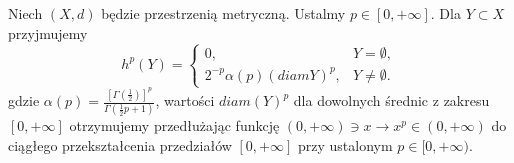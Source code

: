 \begin{defi}
	Niech $(X, d)$ będzie przestrzenią metryczną. Ustalmy $p \in [0, +\infty]$. Dla $Y \subset X$ przyjmujemy 
	$$
		h^p(Y) = 
		\begin{cases}
			0, & Y = \emptyset, \\
			2^{-p}\alpha(p)(diam Y)^p, & Y \neq \emptyset.
		\end{cases}
	$$ gdzie $\alpha(p) = \frac{[\Gamma(\frac{1}{2})]^p}{\Gamma(\frac{1}{2}p + 1)}$, wartości $diam(Y)^p$ dla dowolnych średnic z zakresu $[0, +\infty]$ otrzymujemy przedłużając funkcję $(0, +\infty) \ni x \rightarrow x^p \in (0, +\infty)$ do ciągłego przekształcenia przedziałów $[0, +\infty]$ przy ustalonym $p \in [0, +\infty)$.
\end{defi}